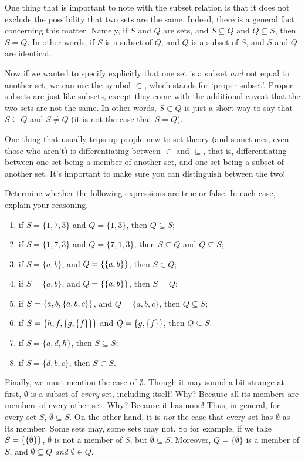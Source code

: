 One thing that is important to note with the subset relation is that it does not exclude the possibility that two sets are the same. Indeed, there is a general fact concerning this matter. Namely, if $S$ and $Q$ are sets, and $S \subseteq Q$ and $Q \subseteq S$, then $S=Q$. In other words, if $S$ is a subset of $Q$, and $Q$ is a subset of $S$, and $S$ and $Q$ are identical. 

Now if we wanted to specify explicitly that one set is a subset \textit{and} not equal to another set, we can use the symbol $\subset$, which stands for `proper subset'. Proper subsets are just like subsets, except they come with the additional caveat that the two sets are not the same. In other words, $S \subset Q$ is just a short way to say that $S \subseteq Q$ and $S \neq Q$ (it is not the case that $S = Q$). 

One thing that usually trips up people new to set theory (and sometimes, even those who aren't) is differentiating between $\in$ and $\subseteq$, that is, differentiating between one set being a member of another set, and one set being a subset of another set. It's important to make sure you can distinguish between the two!

\begin{exc}
Determine whether the following expressions are true or false. In each case, explain your reasoning. 

\begin{enumerate}
	\item if $S=\{1, 7, 3\}$ and $Q=\{1, 3\}$, then $Q \subseteq S$;
	\item if $S=\{1, 7, 3\}$ and $Q=\{7, 1, 3\}$, then $S \subseteq Q$ and $Q \subseteq S$;
	\item if $S=\{a, b\}$, and $Q=\{\{a, b\}\}$, then $S \in Q$;
	\item if $S=\{a, b\}$, and $Q=\{\{a, b\}\}$, then $S = Q$;
	\item if $S=\{a, b, \{a, b, c\}\}$, and $Q=\{a, b, c\}$, then $Q \subseteq S$;
	\item if $S=\{h, f, \{g,\{f\}\}\}$ and $Q=\{g, \{f\}\}$, then $Q \subseteq S$. 
	\item if $S=\{a, d, h\}$, then $S \subseteq S$;
	\item if $S=\{d, b, c\}$, then $S \subset S$.
\end{enumerate}
\end{exc}

Finally, we must mention the case of $\emptyset$. Though it may sound a bit strange at first, $\emptyset$ is a subset of \textit{every} set, including itself! Why? Because all its members are members of every other set. Why? Because it has none! Thus, in general, for every set $S$, $\emptyset \subseteq S$. On the other hand, it is \textit{not} the case that every set has $\emptyset$ as its member. Some sets may, some sets may not. So for example, if we take $S=\{\{\emptyset\}\}$, $\emptyset$ is not a member of $S$, but $\emptyset \subseteq S$. Moreover, $Q=\{\emptyset\}$ is a member of $S$, and $\emptyset \subseteq Q$ \textit{and} $\emptyset \in Q$. 

